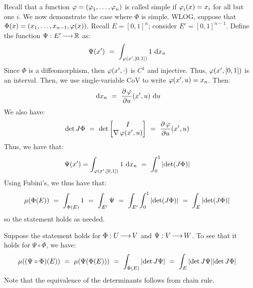 \newpage
\begin{pf}[title=Simple case]
    Recall that a function $ \operatorname{\varphi} = (\operatorname{\varphi}_{1},\dots,\operatorname{\varphi}_{n}) $ is called
    simple if $ \operatorname{\varphi}_{i}(x) = x_{i} $ for all but one $ i $. We now demonstrate
    the case where $ \Phi $ is simple. \vsp
    WLOG, suppose that $ \Phi(x) = (x_{1}, \dots, x_{n-1}, \operatorname{\varphi}(x)) $. Recall
    $ E = [0,1]^{n} $; consider $ E' = [0,1]^{n-1} $. Define the function
    $ \Psi: E' \operatorname{\longrightarrow} \mathbb{R} $ as:
    \begin{equation*}
        \Psi(x') \ = \ \int_{\vphi(x',[0,1])}1\di x_{n}
    \end{equation*}
    Since $ \Phi $ is a diffeomorphism, then $ \operatorname{\varphi}(x', \cdot) $ is $ C^{1} $
    and injective. Thus, $ \operatorname{\varphi}(x',[0,1]) $ is an interval. Then, we use
    single-variable CoV to write $ \operatorname{\varphi}(x',u) = x_{n} $. Then:
    \begin{equation*}
        \textrm{ d} x_{n} \ = \ \frac{\partial \operatorname{\varphi}}{\partial u}(x',u)\textrm{ d} u
    \end{equation*}
    We also have:
    \begin{equation*}
        \det J\Phi \ = \ \det
        \begin{bmatrix}
            I \\ \nabla\vphi(x',u)
        \end{bmatrix}
        \ = \ \frac{\p \vphi}{\p u}(x', u)
    \end{equation*}
    Thus, we have that:
    \begin{equation*}
        \Psi(x') = \int_{\operatorname{\varphi}(x',[0,1])}1\textrm{ d} x_{n} \ = \ \int_{0}^{1}
        \abs{\det(J\Phi)}
    \end{equation*}
    Using Fubini's, we thus have that:
    \begin{equation*}
        \mu(\Phi(E)) \ = \ \int_{\Phi(E)}1 \ = \ \int_{E'}\Psi \ = \
        \int_{E'}\int_{0}^{1}\abs{\det(J\Phi)} \ = \ \int_{E}\abs{\det(J\Phi)}
    \end{equation*}
    so the statement holds as needed.
\end{pf}

\newpage
\begin{pf}[title=Composition]
    Suppose the statement holds for $ \Phi:U\operatorname{\longrightarrow} V $ and $ \Psi:V\operatorname{\longrightarrow} W $.
    To see that it holds for $ \Psi\circ\Phi $, we have:
    \begin{equation*}
        \mu((\Psi\circ\Phi)(E)) \ = \ \mu(\Psi(\Phi(E))) \ = \
        \int_{\Phi(E)}\abs{\det J\Psi} \ = \ \int_{E}\abs{\det J\Psi}
        \abs{\det J\Phi}
    \end{equation*}
    Note that the equivalence of the determinants follows from chain rule.
\end{pf}

